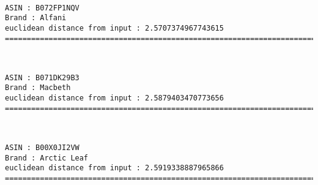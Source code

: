 \documentclass[11pt]{article}
\begin{document}
    \begin{center}
    \end{center}
    { \hspace*{\fill} \\}
    
    \begin{Verbatim}[commandchars=\\\{\}]
ASIN : B072FP1NQV
Brand : Alfani
euclidean distance from input : 2.5707374967743615
=============================================================================================================================

    \end{Verbatim}

    
    
    \begin{center}
    \end{center}
    { \hspace*{\fill} \\}
    
    \begin{Verbatim}[commandchars=\\\{\}]
ASIN : B071DK29B3
Brand : Macbeth
euclidean distance from input : 2.5879403470773656
=============================================================================================================================

    \end{Verbatim}

    
    
    \begin{center}
    \end{center}
    { \hspace*{\fill} \\}
    
    \begin{Verbatim}[commandchars=\\\{\}]
ASIN : B00X0JI2VW
Brand : Arctic Leaf
euclidean distance from input : 2.5919338887965866
=============================================================================================================================

    \end{Verbatim}

    
    
\end{document}
